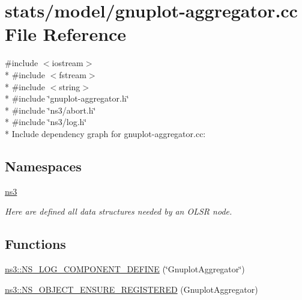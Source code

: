 \hypertarget{gnuplot-aggregator_8cc}{}\section{stats/model/gnuplot-\/aggregator.cc File Reference}
\label{gnuplot-aggregator_8cc}
{\ttfamily \#include $<$iostream$>$}\\*
{\ttfamily \#include $<$fstream$>$}\\*
{\ttfamily \#include $<$string$>$}\\*
{\ttfamily \#include \char`\"{}gnuplot-\/aggregator.\+h\char`\"{}}\\*
{\ttfamily \#include \char`\"{}ns3/abort.\+h\char`\"{}}\\*
{\ttfamily \#include \char`\"{}ns3/log.\+h\char`\"{}}\\*
Include dependency graph for gnuplot-\/aggregator.cc\+:
\subsection*{Namespaces}
\begin{DoxyCompactItemize}
\item 
 \hyperlink{namespacens3}{ns3}
\begin{DoxyCompactList}\small\item\em Here are defined all data structures needed by an O\+L\+SR node. \end{DoxyCompactList}\end{DoxyCompactItemize}
\subsection*{Functions}
\begin{DoxyCompactItemize}
\item 
\hyperlink{namespacens3_a2d2f2cb596ddd1b92beda888cd78723d}{ns3\+::\+N\+S\+\_\+\+L\+O\+G\+\_\+\+C\+O\+M\+P\+O\+N\+E\+N\+T\+\_\+\+D\+E\+F\+I\+NE} (\char`\"{}Gnuplot\+Aggregator\char`\"{})
\item 
\hyperlink{namespacens3_ac7d7fa8ca0d147fc539923d2581a2fa3}{ns3\+::\+N\+S\+\_\+\+O\+B\+J\+E\+C\+T\+\_\+\+E\+N\+S\+U\+R\+E\+\_\+\+R\+E\+G\+I\+S\+T\+E\+R\+ED} (Gnuplot\+Aggregator)
\end{DoxyCompactItemize}
